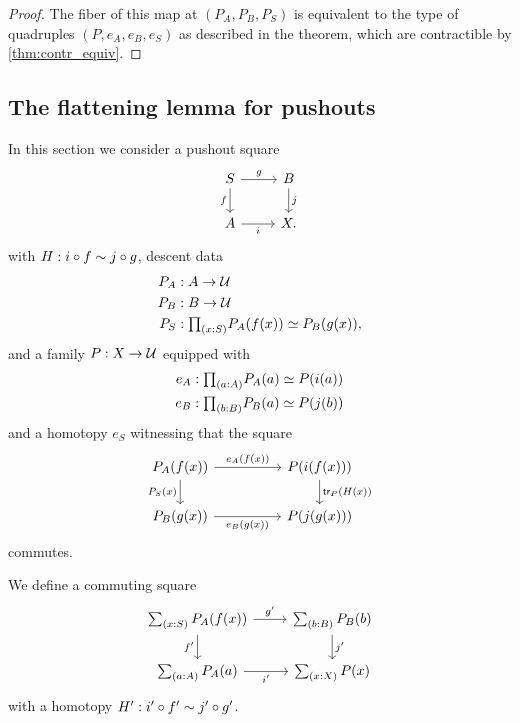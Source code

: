 \begin{proof}
The fiber of this map at $(P_A,P_B,P_S)$ is equivalent to the type of quadruples $(P,e_A,e_B,e_S)$ as described in the theorem, which are contractible by \cref{thm:contr_equiv}.
\end{proof}

\subsection{The flattening lemma for pushouts}

In this section we consider a pushout square
\begin{equation*}
\begin{tikzcd}
S \arrow[r,"g"] \arrow[d,swap,"f"] & B \arrow[d,"j"] \\
A \arrow[r,swap,"i"] & X.
\end{tikzcd}
\end{equation*}
with $H:i\circ f\sim j\circ g$, descent data
\begin{align*}
P_A & : A \to \UU \\
P_B & : B \to \UU \\
P_S & : \prd{x:S} \eqv{P_A(f(x))}{P_B(g(x))},
\end{align*}
and a family $P:X\to\mathcal{U}$ equipped with 
\begin{align*}
e_A & : \prd{a:A}\eqv{P_A(a)}{P(i(a))} \\
e_B & : \prd{b:B}\eqv{P_B(a)}{P(j(b))}
\end{align*}
and a homotopy $e_S$ witnessing that the square
\begin{equation*}
\begin{tikzcd}[column sep=huge]
P_A(f(x)) \arrow[r,"e_A(f(x))"] \arrow[d,swap,"P_S(x)"] & P(i(f(x))) \arrow[d,"\mathsf{tr}_P(H(x))"] \\
P_B(g(x)) \arrow[r,swap,"e_B(g(x))"] & P(j(g(x)))
\end{tikzcd}
\end{equation*}
commutes.

\begin{defn}
We define a commuting square
\begin{equation*}
\begin{tikzcd}
\sm{x:S}P_A(f(x)) \arrow[d,swap,"{f'}"] \arrow[r,"{g'}"] & \sm{b:B}P_B(b) \arrow[d,"{j'}"] \\
\sm{a:A}P_A(a) \arrow[r,swap,"{i'}"] & \sm{x:X}P(x)
\end{tikzcd}
\end{equation*}
with a homotopy $H':i'\circ f'\sim j'\circ g'$.
\end{defn}

